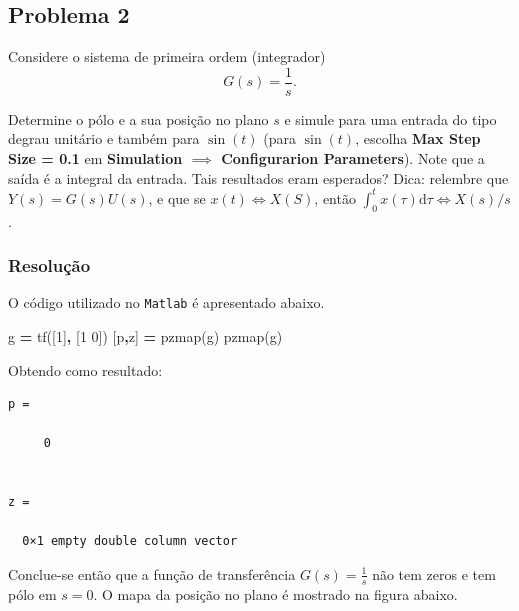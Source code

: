 \documentclass[
]{book}
\newenvironment{Shaded}{\begin{snugshade}}{\end{snugshade}}
\newcommand{\FloatTok}[1]{\textcolor[rgb]{0.00,0.00,0.81}{#1}}
\newcommand{\NormalTok}[1]{#1}
\newcommand{\OperatorTok}[1]{\textcolor[rgb]{0.81,0.36,0.00}{\textbf{#1}}}
\newcommand{\VariableTok}[1]{\textcolor[rgb]{0.00,0.00,0.00}{#1}}
\begin{document}
\hypertarget{problema-2}{%
\subsection*{Problema 2}\label{problema-2}}

Considere o sistema de primeira ordem (integrador)
\[
G(s) = \frac {1}{s}.
\]

Determine o pólo e a sua posição no plano \(s\) e simule para uma entrada do tipo degrau unitário e também para \(\sin {(t)}\) (para \(\sin {(t)}\), escolha \textbf{Max Step Size = 0.1} em \textbf{Simulation \(\implies\) Configurarion Parameters}). Note que a saída é a integral da entrada. Tais resultados eram esperados? Dica: relembre que \(Y(s) = G(s)U(s)\), e que se \(x(t) \iff X(S)\), então \(\int_0^t x(\tau) \mathrm{d}\tau \iff X(s)/s\).

\hypertarget{resoluuxe7uxe3o-1}{%
\subsubsection*{Resolução}\label{resoluuxe7uxe3o-1}}

O código utilizado no \texttt{Matlab} é apresentado abaixo.

\begin{Shaded}
\begin{Highlighting}[]
\VariableTok{g} \OperatorTok{=} \VariableTok{tf}\NormalTok{([}\FloatTok{1}\NormalTok{]}\OperatorTok{,}\NormalTok{ [}\FloatTok{1} \FloatTok{0}\NormalTok{])}
\NormalTok{[}\VariableTok{p}\OperatorTok{,}\VariableTok{z}\NormalTok{] }\OperatorTok{=} \VariableTok{pzmap}\NormalTok{(}\VariableTok{g}\NormalTok{)}
\VariableTok{pzmap}\NormalTok{(}\VariableTok{g}\NormalTok{)}
\end{Highlighting}
\end{Shaded}

Obtendo como resultado:

\begin{verbatim}
p =

     0


z =

  0×1 empty double column vector
\end{verbatim}

Conclue-se então que a função de transferência \(G(s) = \frac {1}{s}\) não tem zeros e tem pólo em \(s = 0\). O mapa da posição no plano é mostrado na figura abaixo.
\end{document}
